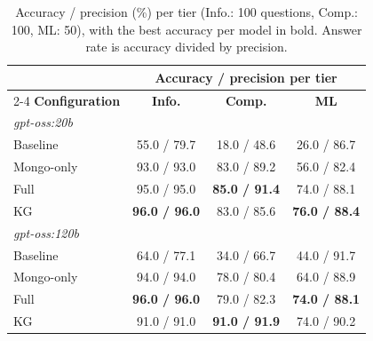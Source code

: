 \begin{table}[t]
\centering
\footnotesize
\setlength{\tabcolsep}{4pt}
\caption{Accuracy / precision (\%) per tier (Info.: 100 questions, Comp.: 100, ML: 50), with the best accuracy per model in bold. Answer rate is accuracy divided by precision.}
\label{tab:tier-results}
\begin{tabular}{lccc}
\toprule
 & \multicolumn{3}{c}{\textbf{Accuracy / precision per tier}} \\
\cmidrule(lr){2-4}
\textbf{Configuration} & \textbf{Info.} & \textbf{Comp.} & \textbf{ML} \\
\midrule
\multicolumn{4}{l}{\textit{gpt-oss:20b}} \\
Baseline   & 55.0 / 79.7 & 18.0 / 48.6 & 26.0 / 86.7 \\
Mongo-only   & 93.0 / 93.0 & 83.0 / 89.2 & 56.0 / 82.4 \\
Full   & 95.0 / 95.0 & \textbf{85.0 / 91.4} & 74.0 / 88.1 \\
KG   & \textbf{96.0 / 96.0} & 83.0 / 85.6 & \textbf{76.0 / 88.4} \\
\midrule
\multicolumn{4}{l}{\textit{gpt-oss:120b}} \\
Baseline   & 64.0 / 77.1 & 34.0 / 66.7 & 44.0 / 91.7 \\
Mongo-only   & 94.0 / 94.0 & 78.0 / 80.4 & 64.0 / 88.9 \\
Full   & \textbf{96.0 / 96.0} & 79.0 / 82.3 & \textbf{74.0 / 88.1} \\
KG   & 91.0 / 91.0 & \textbf{91.0 / 91.9} & 74.0 / 90.2 \\
\bottomrule
\end{tabular}
\end{table}

